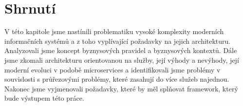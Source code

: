 \section{Shrnutí}

V této kapitole jsme nastínili problematiku vysoké komplexity moderních informačních systémů
a z toho vyplívající požadavky na jejich architekturu. Analyzovali jsme koncept byznysových
pravidel a byznysových kontextů. Dále jsme zkomali architekturu orientovanou na služby, její
výhody a nevýhody, její moderní evoluci v podobě microservices a identifikovali jsme problémy
v souvislosti s průřezovými problémy, které zasahují do více služeb najednou. Nakonec jsme
vyjmenovali požadavky, které by měl splňovat framework, který bude výstupem této práce.
